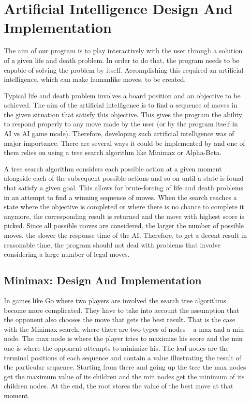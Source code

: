 \documentclass{l3proj}
\begin{document}
\section{Artificial Intelligence Design And Implementation}

The aim of our program is to play interactively with the user through a solution of a given life and death problem. In order to do that, the program needs to be capable of solving the problem by itself. Accomplishing this required an artificial intelligence, which can make humanlike moves, to be created.
 
Typical life and death problem involves a board position and an objective to be achieved. The aim of the artificial intelligence is to find a sequence of moves in the given situation that satisfy this objective. This gives the program the ability to respond properly to any move made by the user (or by the program itself in AI vs AI game mode). Therefore, developing such artificial intelligence was of major importance. There are several ways it could be implemented by and one of them relies on using a tree search algorithm like Minimax or Alpha-Beta.
 
A tree search algorithm considers each possible action at a given moment alongside each of the subsequent possible actions and so on until a state is found that satisfy a given goal. This allows for brute-forcing of life and death problems in an attempt to find a winning sequence of moves. When the search reaches a state where the objective is completed or where there is no chance to complete it anymore, the corresponding result is returned and the move with highest score is picked. Since all possible moves are considered, the larger the number of possible moves, the slower the response time of the AI. Therefore, to get a decent result in reasonable time, the program should not deal with problems that involve considering a large number of legal moves.

\subsection{Minimax: Design And Implementation}

In games like Go where two players are involved the search tree algorithms become more complicated. They have to take into account the assumption that the opponent also chooses the move that gets the best result. That is the case with the Minimax search, where there are two types of nodes – a max and a min node. The max node is where the player tries to maximize his score and the min one is where the opponent attempts to minimize his. The leaf nodes are the terminal positions of each sequence and contain a value illustrating the result of the particular sequence. Starting from there and going up the tree the max nodes get the maximum value of its children and the min nodes get the minimum of its children nodes. At the end, the root stores the value of the best move at that moment.  
\end{document}
